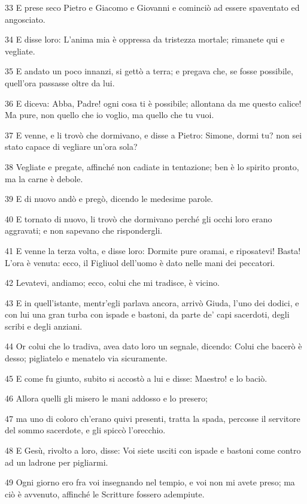 \par 33 E prese seco Pietro e Giacomo e Giovanni e cominciò ad essere spaventato ed angosciato.
\par 34 E disse loro: L'anima mia è oppressa da tristezza mortale; rimanete qui e vegliate.
\par 35 E andato un poco innanzi, si gettò a terra; e pregava che, se fosse possibile, quell'ora passasse oltre da lui.
\par 36 E diceva: Abba, Padre! ogni cosa ti è possibile; allontana da me questo calice! Ma pure, non quello che io voglio, ma quello che tu vuoi.
\par 37 E venne, e li trovò che dormivano, e disse a Pietro: Simone, dormi tu? non sei stato capace di vegliare un'ora sola?
\par 38 Vegliate e pregate, affinché non cadiate in tentazione; ben è lo spirito pronto, ma la carne è debole.
\par 39 E di nuovo andò e pregò, dicendo le medesime parole.
\par 40 E tornato di nuovo, li trovò che dormivano perché gli occhi loro erano aggravati; e non sapevano che rispondergli.
\par 41 E venne la terza volta, e disse loro: Dormite pure oramai, e riposatevi! Basta! L'ora è venuta: ecco, il Figliuol dell'uomo è dato nelle mani dei peccatori.
\par 42 Levatevi, andiamo; ecco, colui che mi tradisce, è vicino.
\par 43 E in quell'istante, mentr'egli parlava ancora, arrivò Giuda, l'uno dei dodici, e con lui una gran turba con ispade e bastoni, da parte de' capi sacerdoti, degli scribi e degli anziani.
\par 44 Or colui che lo tradiva, avea dato loro un segnale, dicendo: Colui che bacerò è desso; pigliatelo e menatelo via sicuramente.
\par 45 E come fu giunto, subito si accostò a lui e disse: Maestro! e lo baciò.
\par 46 Allora quelli gli misero le mani addosso e lo presero;
\par 47 ma uno di coloro ch'erano quivi presenti, tratta la spada, percosse il servitore del sommo sacerdote, e gli spiccò l'orecchio.
\par 48 E Gesù, rivolto a loro, disse: Voi siete usciti con ispade e bastoni come contro ad un ladrone per pigliarmi.
\par 49 Ogni giorno ero fra voi insegnando nel tempio, e voi non mi avete preso; ma ciò è avvenuto, affinché le Scritture fossero adempiute.
